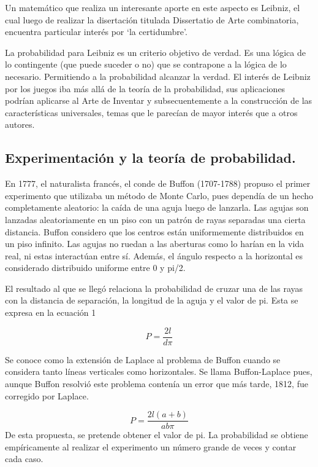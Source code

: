 \documentclass{rbf}
\begin{document}
Un matemático que realiza un interesante aporte en este aspecto es Leibniz, el cual luego de realizar la disertación titulada Dissertatio de Arte combinatoria, encuentra particular interés por ‘la certidumbre’.

La probabilidad para Leibniz es un criterio objetivo de verdad. Es una lógica de lo contingente (que puede suceder o no) que se contrapone a la lógica de lo necesario. Permitiendo a la probabilidad alcanzar la verdad. El interés de Leibniz por los juegos iba más allá de la teoría de la probabilidad, sus aplicaciones podrían aplicarse al Arte de Inventar y subsecuentemente a la construcción de las características universales, temas que le parecían de mayor interés que a otros autores.
\subsection{Experimentación y la teoría de probabilidad.}
En 1777, el naturalista francés, el conde de Buffon (1707-1788) propuso el primer experimento que utilizaba un método de Monte Carlo, pues dependía de un hecho completamente aleatorio: la caída de una aguja luego de lanzarla. Las agujas son lanzadas aleatoriamente en un piso con un patrón de rayas separadas una cierta distancia. Buffon considero que los centros están uniformemente distribuidos en un piso infinito. Las agujas no ruedan a las aberturas como lo harían en la vida real, ni estas interactúan entre sí. Además, el ángulo respecto a la horizontal es considerado distribuido uniforme entre 0 y pi/2.

El resultado al que se llegó relaciona la probabilidad de cruzar una de las rayas con la distancia de separación, la longitud de la aguja y el valor de pi. Esta se expresa en la ecuación 1

\begin{equation}
    P=\frac{2l}{d\pi}
\end{equation}

Se conoce como la extensión de Laplace al problema de Buffon cuando se considera tanto líneas verticales como horizontales. Se llama Buffon-Laplace pues, aunque Buffon resolvió este problema contenía un error que más tarde, 1812, fue corregido por Laplace.

\begin{equation}
    P=\frac{2l(a+b)}{ab\pi}
\end{equation}
De esta propuesta, se pretende obtener el valor de pi. La probabilidad se obtiene empíricamente al realizar el experimento un número grande de veces y contar cada caso.
\end{document}
